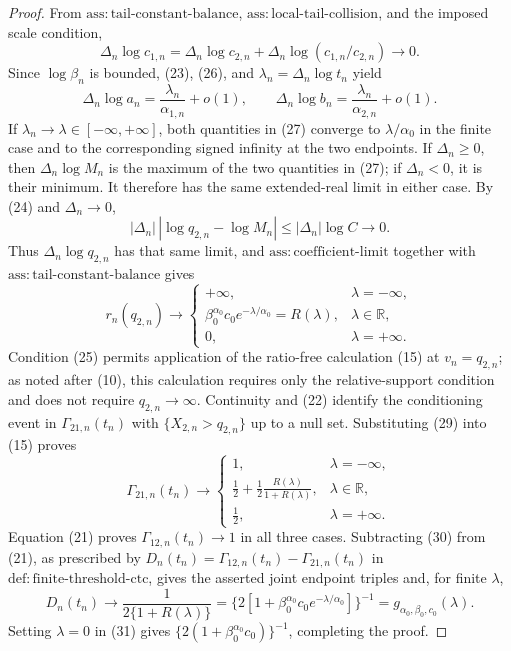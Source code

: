 \documentclass{article}
\begin{document}
\begin{proof}
From \(\mathrm{ass{:}tail\text{-}constant\text{-}balance}\), \(\mathrm{ass{:}local\text{-}tail\text{-}collision}\), and the imposed scale condition,
\[
\Delta_n\log c_{1,n}
=\Delta_n\log c_{2,n}
+\Delta_n\log(c_{1,n}/c_{2,n})\to0.
\tag{26}
\]
Since \(\log\beta_n\) is bounded, (23), (26), and \(\lambda_n=\Delta_n\log t_n\) yield
\[
\Delta_n\log a_n=\frac{\lambda_n}{\alpha_{1,n}}+o(1),
\qquad
\Delta_n\log b_n=\frac{\lambda_n}{\alpha_{2,n}}+o(1).
\tag{27}
\]
If \(\lambda_n\to\lambda\in[-\infty,+\infty]\), both quantities in (27) converge to \(\lambda/\alpha_0\) in the finite case and to the corresponding signed infinity at the two endpoints. If \(\Delta_n\geq0\), then \(\Delta_n\log M_n\) is the maximum of the two quantities in (27); if \(\Delta_n<0\), it is their minimum. It therefore has the same extended-real limit in either case. By (24) and \(\Delta_n\to0\),
\[
|\Delta_n|\,|\log q_{2,n}-\log M_n|
\leq|\Delta_n|\log C\to0.
\tag{28}
\]
Thus \(\Delta_n\log q_{2,n}\) has that same limit, and \(\mathrm{ass{:}coefficient\text{-}limit}\) together with \(\mathrm{ass{:}tail\text{-}constant\text{-}balance}\) gives
\[
r_n(q_{2,n})\longrightarrow
\begin{cases}
+\infty, & \lambda=-\infty,\\
\beta_0^{\alpha_0}c_0e^{-\lambda/\alpha_0}=R(\lambda), & \lambda\in\mathbb R,\\
0, & \lambda=+\infty.
\end{cases}
\tag{29}
\]
Condition (25) permits application of the ratio-free calculation (15) at \(v_n=q_{2,n}\); as noted after (10), this calculation requires only the relative-support condition and does not require \(q_{2,n}\to\infty\). Continuity and (22) identify the conditioning event in \(\Gamma_{21,n}(t_n)\) with \(\{X_{2,n}>q_{2,n}\}\) up to a null set. Substituting (29) into (15) proves
\[
\Gamma_{21,n}(t_n)\longrightarrow
\begin{cases}
1, & \lambda=-\infty,\\
\displaystyle\frac12+\frac12\frac{R(\lambda)}{1+R(\lambda)}, & \lambda\in\mathbb R,\\
\frac12, & \lambda=+\infty.
\end{cases}
\tag{30}
\]
Equation (21) proves \(\Gamma_{12,n}(t_n)\to1\) in all three cases. Subtracting (30) from (21), as prescribed by \(D_n(t_n)=\Gamma_{12,n}(t_n)-\Gamma_{21,n}(t_n)\) in \(\mathrm{def{:}finite\text{-}threshold\text{-}ctc}\), gives the asserted joint endpoint triples and, for finite \(\lambda\),
\[
D_n(t_n)\to\frac1{2\{1+R(\lambda)\}}
=\{2[1+\beta_0^{\alpha_0}c_0e^{-\lambda/\alpha_0}]\}^{-1}
=g_{\alpha_0,\beta_0,c_0}(\lambda).
\tag{31}
\]
Setting \(\lambda=0\) in (31) gives \(\{2(1+\beta_0^{\alpha_0}c_0)\}^{-1}\), completing the proof.
\end{proof}
\end{document}
